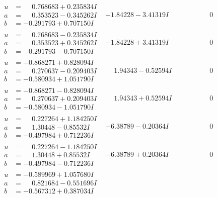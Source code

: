 \documentclass[1p]{elsarticle_modified}
\theoremstyle{definition}
\begin{document}
$$\begin{array}{c|c|c}
\begin{aligned}
u &= \phantom{-}0.768683 + 0.235834 I \\
a &= \phantom{-}0.353523 - 0.345262 I \\
b &= -0.291793 + 0.707150 I\end{aligned}
 & -1.84228 - 3.41319 I & \phantom{-0.000000 } 0 \\ \hline\begin{aligned}
u &= \phantom{-}0.768683 - 0.235834 I \\
a &= \phantom{-}0.353523 + 0.345262 I \\
b &= -0.291793 - 0.707150 I\end{aligned}
 & -1.84228 + 3.41319 I & \phantom{-0.000000 } 0 \\ \hline\begin{aligned}
u &= -0.868271 + 0.828094 I \\
a &= \phantom{-}0.270637 - 0.209403 I \\
b &= -0.580934 + 1.051790 I\end{aligned}
 & \phantom{-}1.94343 - 0.52594 I & \phantom{-0.000000 } 0 \\ \hline\begin{aligned}
u &= -0.868271 - 0.828094 I \\
a &= \phantom{-}0.270637 + 0.209403 I \\
b &= -0.580934 - 1.051790 I\end{aligned}
 & \phantom{-}1.94343 + 0.52594 I & \phantom{-0.000000 } 0 \\ \hline\begin{aligned}
u &= \phantom{-}0.227264 + 1.184250 I \\
a &= \phantom{-}1.30448 - 0.85532 I \\
b &= -0.497984 + 0.712236 I\end{aligned}
 & -6.38789 - 0.20364 I & \phantom{-0.000000 } 0 \\ \hline\begin{aligned}
u &= \phantom{-}0.227264 - 1.184250 I \\
a &= \phantom{-}1.30448 + 0.85532 I \\
b &= -0.497984 - 0.712236 I\end{aligned}
 & -6.38789 + 0.20364 I & \phantom{-0.000000 } 0 \\ \hline\begin{aligned}
u &= -0.589969 + 1.057680 I \\
a &= \phantom{-}0.821684 - 0.551696 I \\
b &= -0.567312 + 0.387034 I\end{aligned}

\end{array}$$
\end{document}
